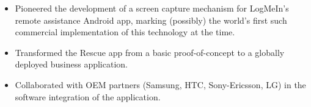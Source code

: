 \begin{itemize}
  \item Pioneered the development of a screen capture mechanism for LogMeIn's remote assistance Android app, marking (possibly) the world's first such commercial implementation of this technology at the time.
  \item Transformed the Rescue app from a basic proof-of-concept to a globally deployed business application.
  \item Collaborated with OEM partners (Samsung, HTC, Sony-Ericsson, LG) in the software integration of the application.
\end{itemize}
\divider
